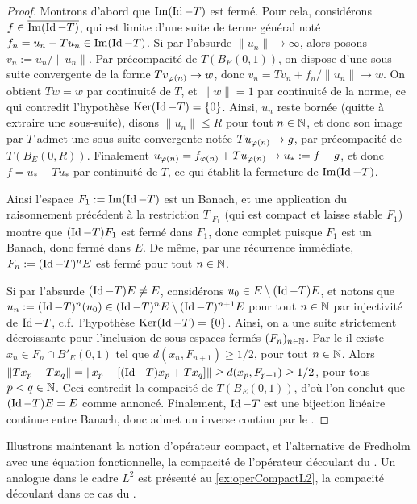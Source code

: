 \begin{proof}
	Montrons d'abord que $\operatorname{Im}(\operatorname{Id}-T)$ est fermé. 
	Pour cela, considérons $f \in \overline {\operatorname{Im}(\operatorname{Id}-T)}$, qui est limite d'une suite de terme général noté $f_n = u_n - T u_n \in \operatorname{Im}(\operatorname{Id}-T)$. 
	Si par l'absurde $\|u_n\| \to \infty$, alors posons $v_n := u_n/\|u_n\|$. Par précompacité de $T(B_E(0,1))$, on dispose d'une sous-suite convergente de la forme $T v_{\varphi(n)} \to w$, donc $v_n = T v_n + f_n/\|u_n\| \to w$. On obtient $T w = w$ par continuité de $T$, et $\|w\|=1$ par continuité de la norme, ce qui contredit l'hypothèse $\operatorname{Ker}(\operatorname{Id}-T) = \{0\}$. 
	Ainsi, $u_n$ reste bornée (quitte à extraire une sous-suite), disons $\|u_n\| \leq R$ pour tout $n \in \mathbb{N}$, et donc son image par $T$ admet une sous-suite convergente notée $T u_{\varphi(n)} \to g$, par précompacité de $T(B_E(0,R))$. 
	Finalement $u_{\varphi(n)} = f_{\varphi(n)} + T u_{\varphi(n)} \to u_* := f+g$, et donc $f = u_*-T u_*$ par continuité de $T$, ce qui établit la fermeture de $\operatorname{Im}(\operatorname{Id}-T)$.

	Ainsi l'espace $F_1 := \operatorname{Im}(\operatorname{Id}-T)$ est un Banach, et une application du raisonnement précédent à la restriction $T_{|F_1}$ (qui est compact et laisse stable $F_1$) montre que $(\operatorname{Id}-T)F_1$ est fermé dans $F_1$, donc complet puisque $F_1$ est un Banach, donc fermé dans $E$. De même, par une récurrence immédiate, $F_n := (\operatorname{Id}-T)^n E$ est fermé pour tout $n \in \mathbb{N}$.
	
	Si par l'absurde $(\operatorname{Id}-T)E \neq E$, considérons $u_0 \in E\setminus (\operatorname{Id}-T)E$, et notons que $u_n := (\operatorname{Id}-T)^n(u_0) \in  (\operatorname{Id}-T)^n E\setminus (\operatorname{Id}-T)^{n+1}E$ pour tout $n \in \mathbb{N}$ par injectivité de $\operatorname{Id}-T$, c.f.\ l'hypothèse $\operatorname{Ker}(\operatorname{Id}-T)=\{0\}$. Ainsi, on a une suite strictement décroissante pour l'inclusion de sous-espaces fermés $(F_n)_{n \in \mathbb{N}}$. 
	Par le  il existe $x_n \in F_n \cap B'_E(0,1)$ tel que $d(x_n,F_{n+1}) \geq 1/2$, pour tout $n \in \mathbb{N}$. Alors $\|T x_p - T x_q\| = \|x_p - [(\operatorname{Id}-T) x_p + Tx_q]\| \geq d(x_p,F_{p+1}) \geq 1/2$, pour tous $p<q \in \mathbb{N}$. Ceci contredit la compacité de $\overline {T(B_E(0,1))}$, d'où l'on conclut que $(\operatorname{Id}-T)E = E$ comme annoncé.
	Finalement, $\operatorname{Id}-T$ est une bijection linéaire continue entre Banach, donc admet un inverse continu par le . 
\end{proof}


Illustrons maintenant la notion d'opérateur compact, et l'alternative de Fredholm avec une équation fonctionnelle, la compacité de l'opérateur découlant du . 
Un analogue dans le cadre $L^2$ est présenté au \cref{ex:operCompactL2}, la compacité découlant dans ce cas du .

